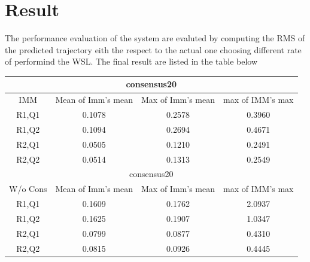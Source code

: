 \documentclass[twocolumn]{article}
\begin{document}
    \section*{Result}
    The performance evaluation of the system are evaluted by computing the RMS of the predicted trajectory eith the respect to the actual one
    choosing different rate of performind the WSL. The final result are listed in the table below
    \begin{center}
        \begin{tabular}{ |c||c|c|c|  }
            \hline
            \multicolumn{4}{|c|}{consensus20} \\
            \hline
            IMM  & Mean of Imm's mean    & Max of Imm's mean     & max of IMM's max  \\ [0.5ex]
            \hline
            R1,Q1           & 0.1078                & 0.2578                & 0.3960                 \\
                \hline
                R1,Q2           & 0.1094                & 0.2694             & 0.4671                      \\
                \hline
                R2,Q1           & 0.0505                &  0.1210           & 0.2491                         \\
                \hline
                R2,Q2           & 0.0514                & 0.1313             & 0.2549                   \\
            \hline
            \multicolumn{4}{|c|}{consensus20} \\
            \hline
            W/o Cons  & Mean of Imm's mean    & Max of Imm's mean     & max of IMM's max  \\ 
            \hline
            R1,Q1           & 0.1609                & 0.1762                & 2.0937                 \\
            \hline
            R1,Q2           & 0.1625                & 0.1907             & 1.0347                     \\
            \hline
            R2,Q1           & 0.0799               &  0.0877           & 0.4310                         \\
            \hline
            R2,Q2           & 0.0815                & 0.0926            & 0.4445                   \\
        \hline
           \end{tabular}
        \end{center}

    \subsection*{}
\end{document}
